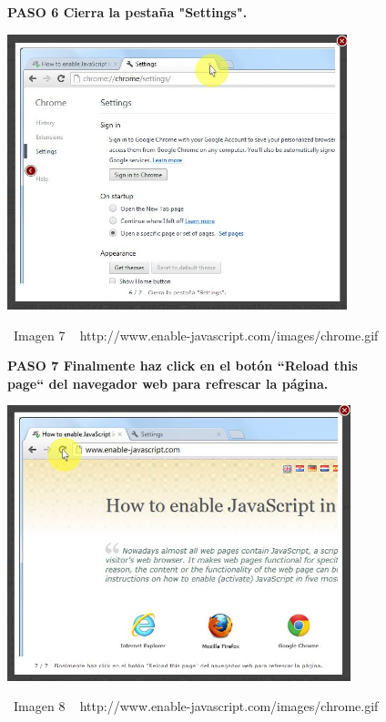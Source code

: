 \documentclass[11pt]{article} %
\begin{document}
\begin{figure}
\begin{center}
\begin{center}

\bf PASO 6 Cierra la pestaña "Settings".
\end{center}

\includegraphics[height=8cm, width=8 cm] {imagenes/chrome 06.jpg}

\ Imagen 7
\ { http://www.enable-javascript.com/images/chrome.gif }


\end{center}
\end{figure}


\begin{figure}
\begin{center}
\begin{center}
\bf PASO 7
Finalmente haz click en el botón ``Reload this page`` del navegador web para refrescar la página.
\newline


\includegraphics[height=8cm, width=8 cm] {imagenes/chrome 07.jpg}
\end{center}
\ Imagen 8
\ { http://www.enable-javascript.com/images/chrome.gif }
\end{center}
\end{figure}
\end{document}
